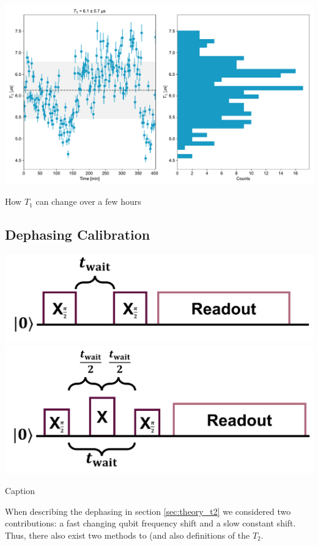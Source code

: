 \begin{marginfigure}[-5 cm]
    \centering
    \includegraphics[]{Calibrations/Figures/T1_over_time.pdf}
    \caption{How $T_1$ can change over a few hours}
    \label{fig:changing_t1}
\end{marginfigure}

\subsection{Dephasing Calibration}
\begin{marginfigure}
    \centering
    \includegraphics{Figs/circuits/t2.png}
    \includegraphics{Figs/circuits/t2_echo.png}
    \caption{Caption}
    \label{fig:enter-label}
\end{marginfigure}

When describing the dephasing in section \ref{sec:theory_t2} we considered two contributions: a fast changing qubit frequency shift and a slow constant shift. Thus, there also exist two methods to (and also definitions of the $T_2$. 



